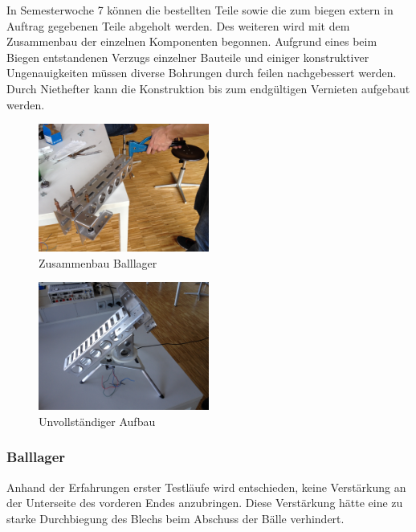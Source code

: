 In Semesterwoche 7 können die bestellten Teile sowie die zum biegen extern in 
Auftrag gegebenen Teile abgeholt werden. Des weiteren wird mit dem Zusammenbau 
der einzelnen Komponenten begonnen. Aufgrund eines beim Biegen entstandenen 
Verzugs einzelner Bauteile und einiger konstruktiver Ungenauigkeiten müssen 
diverse Bohrungen durch feilen nachgebessert werden. Durch Niethefter kann die 
Konstruktion bis zum endgültigen Vernieten aufgebaut werden.

\begin{figure}[h!]          
	\centering             
	\includegraphics[width=0.5\textwidth]{fig/IMG_2290.JPG}
	\caption{Zusammenbau Balllager}
	\label{fig:Zusammenbau Balllager}        
\end{figure}

\begin{figure}[h!]          
	\centering             
	\includegraphics[width=0.5\textwidth]{fig/IMG_2303.JPG}
	\caption{Unvollständiger Aufbau}
	\label{fig:Unvollständiger Aufbau}        
\end{figure}

\subsubsection{Balllager}
Anhand der Erfahrungen erster Testläufe wird entschieden, keine Verstärkung an 
der Unterseite des vorderen Endes anzubringen. Diese Verstärkung hätte eine zu 
starke Durchbiegung des Blechs beim Abschuss der Bälle verhindert.

